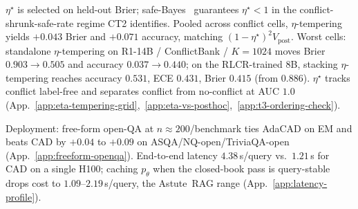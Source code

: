 $\eta^\star$ is selected on held-out Brier; safe-Bayes~\citep{bissiri2016,grunwald2017} guarantees $\eta^\star\!<\!1$ in the conflict-shrunk-safe-rate regime CT2 identifies. Pooled across conflict cells, $\eta$-tempering yields $+0.043$ Brier and $+0.071$ accuracy, matching $(1\!-\!\eta^\star)^{2}V_{\mathrm{post}}$. Worst cells: standalone $\eta$-tempering on R1-14B / ConflictBank / $K\!=\!1024$ moves Brier $0.903\!\to\!0.505$ and accuracy $0.037\!\to\!0.440$; on the RLCR-trained $8$B, stacking $\eta$-tempering reaches accuracy $0.531$, ECE $0.431$, Brier $0.415$ (from $0.886$). $\eta^\star$ tracks conflict label-free and separates conflict from no-conflict at AUC $1.0$ (App.~\ref{app:eta-tempering-grid},~\ref{app:eta-vs-posthoc},~\ref{app:t3-ordering-check}).

Deployment: free-form open-QA at $n\!\approx\!200$/benchmark ties AdaCAD on EM and beats CAD by $+0.04$ to $+0.09$ on ASQA/NQ-open/TriviaQA-open (App.~\ref{app:freeform-openqa}). End-to-end latency $4.38$\,s/query vs.\ $1.21$\,s for CAD on a single H100; caching $p_\theta$ when the closed-book pass is query-stable drops cost to $1.09$--$2.19$\,s/query, the Astute~RAG range (App.~\ref{app:latency-profile}).

\enlargethispage{18\baselineskip}
\FloatBarrier
